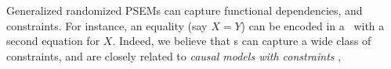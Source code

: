 Generalized randomized PSEMs
can capture functional dependencies, and constraints. 
For instance, an equality (say $X = Y$) 
can be encoded in a
\GRPSEM\
with a second equation for $X$.
Indeed, we believe that 
\GRPSEM s
can capture a wide class of constraints, 
and are closely related to
\emph{causal models with constraints} \citep{beckers2023causal},
